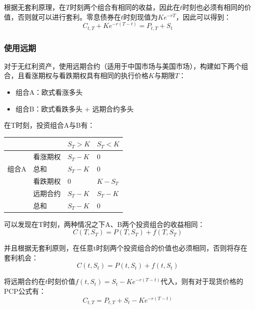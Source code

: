 \documentclass[11pt]{article}
\begin{document}
根据无套利原理，在$T$时刻两个组合有相同的收益，因此在$t$时刻也必须有相同的价值，否则就可以进行套利。零息债券在$t$时刻现值为$Ke^{-rT}$，因此可以得到：
\begin{equation*}
    C_{t,T} + Ke^{-r(T-t)} = P_{t,T} + S_t
\end{equation*}

\subsubsection*{使用远期}

对于无红利资产，使用远期合约（适用于中国市场与美国市场），构建如下两个组合，且看涨期权与看跌期权具有相同的执行价格$K$与期限$T$：
\begin{itemize}
    \item 组合A：欧式看涨多头
    \item 组合B：欧式看跌多头 + 远期合约多头
\end{itemize}

在T时刻，投资组合A与B有：
\begin{table}[H]
\centering
\begin{tabular}{@{}clll@{}}
\toprule
                     &   & $S_T>K$ & $S_T<K$ \\ \midrule
\multirow{3}{*}{组合A} & 看涨期权 & $S_T-K$ & $0$ \\
                    & 总和   & $S_T-K$ & $0$ \\ \midrule
\multirow{3}{*}{组合B} & 看跌期权 & $0$ & $K-S_T$ \\
                     & 远期合约 & $S_T-K$ & $S_T-K$ \\
                     & 总和   & $S_T-K$ & $0$ \\ \bottomrule
\end{tabular}
\end{table}

可以发现在T时刻，两种情况之下A、B两个投资组合的收益相同：
\begin{equation*}
    C(T,S_T) = P(T,S_T) + f(T,S_T)
\end{equation*}

并且根据无套利原则，在任意t时刻两个投资组合的价值也必须相同，否则将存在套利机会：
\begin{equation*}
    C(t,S_t) = P(t,S_t) + f(t,S_t)
\end{equation*}

将远期合约在$t$时刻价值$f(t,S_t) = S_t - Ke^{-r(T-t)}$代入，则有对于现货价格的PCP公式有：
\begin{equation*}
    C_{t,T} = P_{t,T} +  S_t - K e^{-r(T-t)}
\end{equation*}
\end{document}
